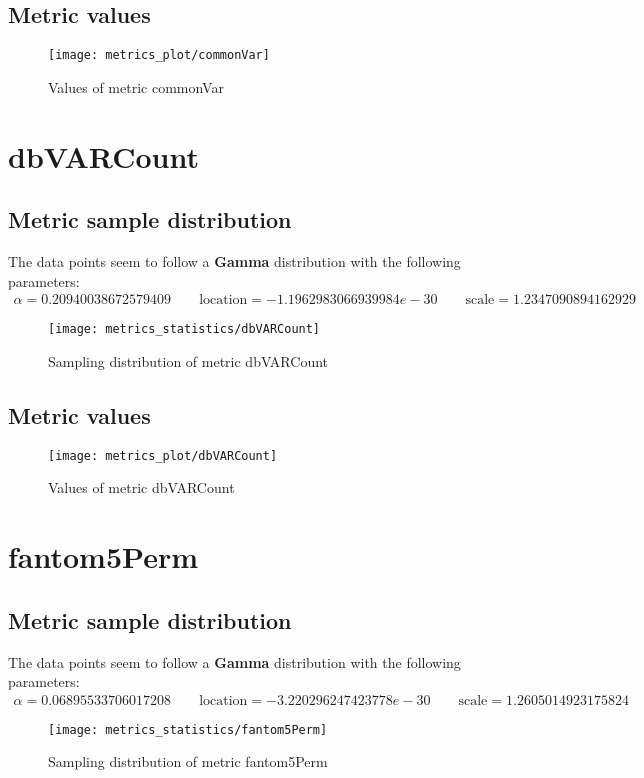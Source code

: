 \documentclass[\main/main.tex]{subfiles}
\begin{document}
\subsection{Metric values}
\begin{figure}
  \texttt{[image: metrics\_plot/commonVar]}
  \caption{Values of metric commonVar}
\end{figure}

\clearpage
\section{dbVARCount}
\subsection{Metric sample distribution}
The data points seem to follow a \textbf{Gamma} distribution with the following parameters:
\begin{align*}
  \alpha   = 0.20940038672579409    \qquad  \text{location} = -1.1962983066939984e-30 \qquad \text{scale} = 1.2347090894162929
\end{align*}
\begin{figure}
  \texttt{[image: metrics\_statistics/dbVARCount]}
  \caption{Sampling distribution of metric dbVARCount}
\end{figure}
\subsection{Metric values}
\begin{figure}
  \texttt{[image: metrics\_plot/dbVARCount]}
  \caption{Values of metric dbVARCount}
\end{figure}

\clearpage
\section{fantom5Perm}
\subsection{Metric sample distribution}
The data points seem to follow a \textbf{Gamma} distribution with the following parameters:
\begin{align*}
  \alpha   = 0.06895533706017208    \qquad  \text{location} = -3.220296247423778e-30 \qquad \text{scale} = 1.2605014923175824
\end{align*}
\begin{figure}
  \texttt{[image: metrics\_statistics/fantom5Perm]}
  \caption{Sampling distribution of metric fantom5Perm}
\end{figure}
\end{document}
